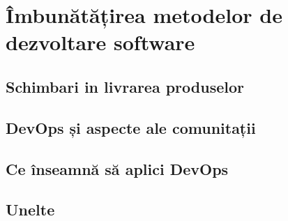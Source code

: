 \chapter{Îmbunătățirea metodelor de dezvoltare software}
\section{Schimbari in livrarea produselor}
\section{DevOps și aspecte ale comunitații}
\section{Ce înseamnă să aplici DevOps}
\section{Unelte}